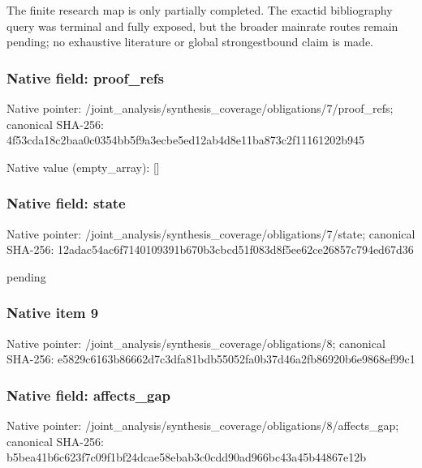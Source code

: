 \documentclass[10pt,a4paper]{article}
\begin{document}
The finite research map is only partially completed. The exactid bibliography query was terminal and fully exposed, but the broader mainrate routes remain pending; no exhaustive literature or global strongestbound claim is made.


\subsubsection{Native field: proof\_refs}


Native pointer: /joint\_analysis/synthesi\allowbreak{}s\_coverage/obligations/7\allowbreak{}/proof\_refs; canonical SHA-256: 4f53cda18c2baa0c0354bb5f\allowbreak{}9a3ecbe5ed12ab4d8e11ba87\allowbreak{}3c2f11161202b945



Native value (empty\_array): []



\subsubsection{Native field: state}


Native pointer: /joint\_analysis/synthesi\allowbreak{}s\_coverage/obligations/7\allowbreak{}/state; canonical SHA-256: 12adac54ac6f7140109391b6\allowbreak{}70b3cbcd51f083d8f5ee62ce\allowbreak{}26857c794ed67d36


pending


\subsubsection{Native item 9}


Native pointer: /joint\_analysis/synthesi\allowbreak{}s\_coverage/obligations/8; canonical SHA-256: e5829c6163b86662d7c3dfa8\allowbreak{}1bdb55052fa0b37d46a2fb86\allowbreak{}920b6e9868ef99c1



\subsubsection{Native field: affects\_gap}


Native pointer: /joint\_analysis/synthesi\allowbreak{}s\_coverage/obligations/8\allowbreak{}/affects\_gap; canonical SHA-256: b5bea41b6c623f7c09f1bf24\allowbreak{}dcae58ebab3c0cdd90ad966b\allowbreak{}c43a45b44867e12b
\end{document}
